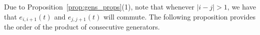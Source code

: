 \documentclass[11pt,letterpaper]{amsart}
\newenvironment{blue}{\relax\color{blue}}{\hspace*{.5ex}\relax}
\newcommand{\bcp}{\begin{blue} }
\newcommand{\ecp}{\end{blue}}
\newtheorem{coro}[theorem]{Corollary}
\newcommand{\FF}{\mathbb{F}}
\begin{document}

Due to Proposition~\ref{prop:gens_props}(1), note that whenever $|i-j|>1$, we have that $e_{i,i+1}(t)$ and $e_{j,j+1}(t)$ will commute. The following proposition provides the order of the product of consecutive generators.
\end{document}
